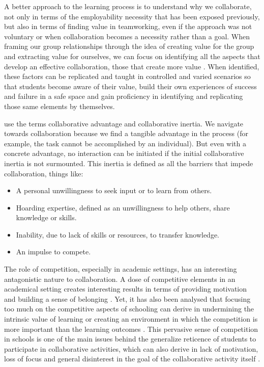 A better approach to the learning process is to understand why we collaborate, not only in terms of the employability necessity that has been exposed previously, but also in terms of finding value in teamworking, even if the approach was not voluntary or when collaboration
becomes a necessity rather than a goal. When framing our group relationships through the idea of creating value for the group and extracting value for ourselves, we can focus on identifying all the aspects that develop an effective collaboration, those that create more
value \parencite{wagner_2010,dawson_2017}. When identified, these factors can be replicated and taught in controlled and varied scenarios so that students become aware of their value, build their own experiences of success and failure in a safe space and gain proficiency in
identifying and replicating those same elements by themselves.

\textcite{hibbert_2005} use the terms collaborative advantage and collaborative inertia. We navigate towards collaboration because we find a tangible advantage in the process (for example, the task cannot be accomplished by an individual). But even with a concrete advantage,
no interaction can be initiated if the initial collaborative inertia is not surmounted. This inertia is defined as all the barriers that impede collaboration, things like:

\begin{itemize}
    \item A personal unwillingness to seek input or to learn from others.
    \item Hoarding expertise, defined as an unwillingness to help others, share knowledge or skills.
    \item Inability, due to lack of skills or resources, to transfer knowledge.
    \item An impulse to compete.
\end{itemize}

The role of competition, especially in academic settings, has an interesting antagonistic nature to collaboration. A dose of competitive elements in an academical setting creates interesting results in terms of providing motivation and building a sense of belonging \parencite{bergin_2016}.
Yet, it has also been analysed that focusing too much on the competitive aspects of schooling can derive in undermining the intrinsic value of learning \parencite{tauer_2004} or creating an environment in which the competition is more important than the learning outcomes \parencite{kowalski_2019}. 
This pervasive sense of competition in schools is one of the main issues behind the generalize reticence of students to participate in collaborative activities, which can also derive in lack of motivation, loss of focus and general disinterest in the goal of the
collaborative activity itself \parencite{driscoll_2025,kloepper_2023}.

